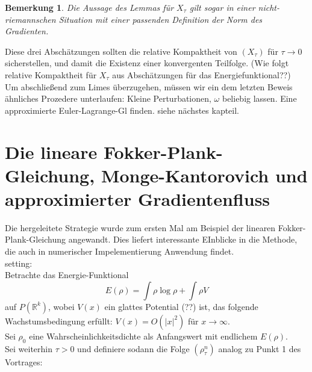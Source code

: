 \documentclass[11pt,a4paper,notitlepage]{scrreprt}
\newcommand{\RR}{\mathbb{R}}
\newtheorem{bem}[defi]{Bemerkung}
\begin{document}
\begin{bem}
Die Aussage des Lemmas für $X_\tau$ gilt sogar in einer nicht-riemannschen Situation mit einer passenden Definition der Norm des Gradienten. 
\end{bem}

Diese drei Abschätzungen sollten die relative Kompaktheit von $(X_\tau)$ für $\tau \to 0$ sicherstellen, und damit die Existenz einer konvergenten Teilfolge. (Wie folgt relative Kompaktheit für $X_\tau$ aus Abschätzungen für das Energiefunktional??) \\
Um abschließend zum Limes überzugehen, müssen wir ein dem letzten Beweis ähnliches Prozedere unterlaufen: Kleine Perturbationen, $\omega$ beliebig lassen. Eine approximierte Euler-Lagrange-Gl finden. siehe nächstes kapteil. 


\section{Die lineare Fokker-Plank-Gleichung, Monge-Kantorovich und approximierter Gradientenfluss}
Die hergeleitete Strategie wurde zum ersten Mal am Beispiel der linearen Fokker-Plank-Gleichung angewandt. Dies liefert interessante EInblicke in die Methode, die auch in numerischer Impelementierung Anwendung findet. \\

setting: \\
Betrachte das Energie-Funktional \[E(\rho)=\int \rho \log \rho + \int\rho V\] auf $P(\RR^k)$, wobei $V(x)$ ein glattes Potential (??) ist, das folgende Wachstumsbedingung erfüllt: $V(x)=O(\vert x \vert^2)$ für $x\to\infty$.\\
Sei $\rho_0$ eine Wahrscheinlichkeitsdichte als Anfangswert mit endlichem $E(\rho)$.\\
Sei weiterhin $\tau>0$ und definiere sodann die Folge $(\rho_\tau^n)$ analog zu Punkt 1 des Vortrages:\\
\end{document}

